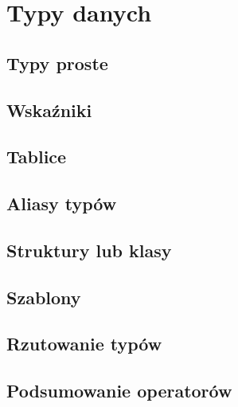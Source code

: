 \chapter{Typy danych}

\section{Typy proste}

\section{Wskaźniki}

\section{Tablice}

\section{Aliasy typów}

\section{Struktury lub klasy}

\section{Szablony}

\section{Rzutowanie typów}

\section{Podsumowanie operatorów}
